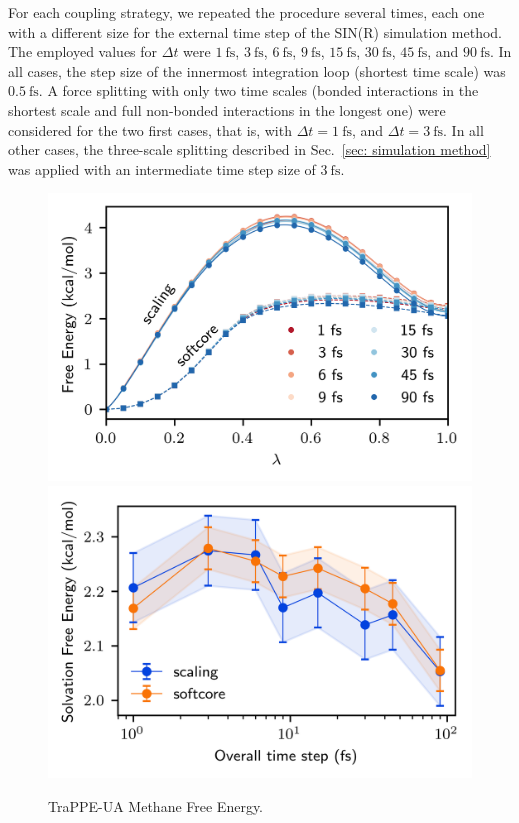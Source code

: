 \documentclass[
aip,
jcp,
reprint,
]{revtex4-1}
\begin{document}
For each coupling strategy, we repeated the procedure several times, each one with a different size for the external time step of the SIN(R) simulation method.
The employed values for $\Delta t$ were $1~\mathrm{fs}$, $3~\mathrm{fs}$, $6~\mathrm{fs}$, $9~\mathrm{fs}$, $15~\mathrm{fs}$, $30~\mathrm{fs}$, $45~\mathrm{fs}$, and $90~\mathrm{fs}$.
In all cases, the step size of the innermost integration loop (shortest time scale) was $0.5~\mathrm{fs}$.
A force splitting with only two time scales (bonded interactions in the shortest scale and full non-bonded interactions in the longest one) were considered for the two first cases, that is, with $\Delta t = 1~\mathrm{fs}$, and $\Delta t = 3~\mathrm{fs}$.
In all other cases, the three-scale splitting described in Sec.~\ref{sec: simulation method} was applied with an intermediate time step size of $3~\mathrm{fs}$.

\begin{figure}
	\centering
	\includegraphics{trappe_methane_vdw_free_energy_profiles}
	\includegraphics{trappe_methane_vdw_free_energies}
	\caption{TraPPE-UA Methane Free Energy.}
	\label{fig:methane free energy}
\end{figure}
\end{document}
